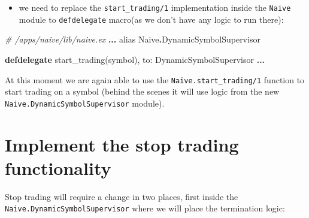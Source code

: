 \documentclass[
  oneside]{book}
\newenvironment{Shaded}{\begin{snugshade}}{\end{snugshade}}
\newcommand{\CommentTok}[1]{\textcolor[rgb]{0.56,0.35,0.01}{\textit{#1}}}
\newcommand{\ConstantTok}[1]{\textcolor[rgb]{0.00,0.00,0.00}{#1}}
\newcommand{\ImportTok}[1]{#1}
\newcommand{\KeywordTok}[1]{\textcolor[rgb]{0.13,0.29,0.53}{\textbf{#1}}}
\newcommand{\NormalTok}[1]{#1}
\newcommand{\OperatorTok}[1]{\textcolor[rgb]{0.81,0.36,0.00}{\textbf{#1}}}
\newcommand{\VariableTok}[1]{\textcolor[rgb]{0.00,0.00,0.00}{#1}}
\providecommand{\tightlist}{%
  \setlength{\itemsep}{0pt}\setlength{\parskip}{0pt}}
\begin{document}
\begin{itemize}
\tightlist
\item
  we need to replace the \texttt{start\_trading/1} implementation inside the \texttt{Naive} module to \texttt{defdelegate} macro(as we don't have any logic to run there):
\end{itemize}

\begin{Shaded}
\begin{Highlighting}[]
\CommentTok{\# /apps/naive/lib/naive.ex}
\OperatorTok{...}
  \ImportTok{alias} \ConstantTok{Naive}\OperatorTok{.}\ConstantTok{DynamicSymbolSupervisor}

  \KeywordTok{defdelegate}\NormalTok{ start\_trading(symbol), }\VariableTok{to:} \ConstantTok{DynamicSymbolSupervisor}
\OperatorTok{...}
\end{Highlighting}
\end{Shaded}

At this moment we are again able to use the \texttt{Naive.start\_trading/1} function to start trading on a symbol (behind the scenes it will use logic from the new \texttt{Naive.DynamicSymbolSupervisor} module).

\hypertarget{implement-the-stop-trading-functionality}{%
\section{Implement the stop trading functionality}\label{implement-the-stop-trading-functionality}}

Stop trading will require a change in two places, first inside the \texttt{Naive.DynamicSymbolSupervisor} where we will place the termination logic:
\end{document}
